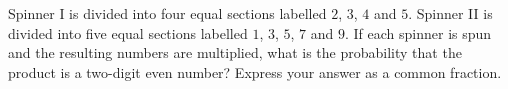 Spinner I is divided into four equal sections labelled $2$, $3$, $4$ and $5$. Spinner II is divided into five equal sections labelled $1$, $3$, $5$, $7$ and $9$. If each spinner is spun and the resulting numbers are multiplied, what is the probability that the product is a two-digit even number? Express your answer as a common fraction.
